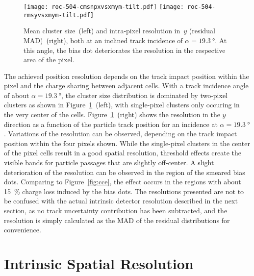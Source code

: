 \documentclass[a4paper,11pt]{article}
\begin{document}
\begin{figure}[tbp]
  \centering
  \texttt{[image: roc-504-cmsnpxvsxmym-tilt.pdf]}%
  \texttt{[image: roc-504-rmsyvsxmym-tilt.pdf]}
  \caption[Mean cluster size and intra-pixel resolution in $y$ at an inclined track incidence]{Mean cluster size~(left) and intra-pixel resolution in~$y$ (residual MAD)~(right), both at an inclined track incidence of $\alpha = \SI{19.3}{\degree}$. At this angle, the bias dot deteriorates the resolution in the respective area of the pixel.}
  \label{fig:rmsy}
\end{figure}

The achieved position resolution depends on the track impact position within the pixel and the charge sharing between adjacent cells. %
With a track incidence angle of about $\alpha = \SI{19.3}{\degree}$, the cluster size distribution is dominated by two-pixel clusters as shown in Figure~\ref{fig:rmsy}~(left), with single-pixel clusters only occuring in the very center of the cells.
Figure~\ref{fig:rmsy}~(right) shows the resolution in the $y$ direction as a function of the particle track position for an incidence at $\alpha = \SI{19.3}{\degree}$.
Variations of the resolution can be observed, depending on the track impact position within the four pixels shown.
While the single-pixel clusters in the center of the pixel cells result in a good spatial resolution, threshold effects create the visible bands for particle passages that are slightly off-center.
A slight deterioration of the resolution can be observed in the region of the smeared bias dots.
Comparing to Figure~\ref{fig:cce}, the effect occurs in the regions with about \SI{15}{\percent} charge loss induced by the bias dots.
The resolutions presented are not to be confused with the actual intrinsic detector resolution described in the next section, as no track uncertainty contribution has been subtracted, and the resolution is simply calculated as the MAD of the residual distributions for convenience.




\section{Intrinsic Spatial Resolution}
\label{sec:resolution}
\end{document}
